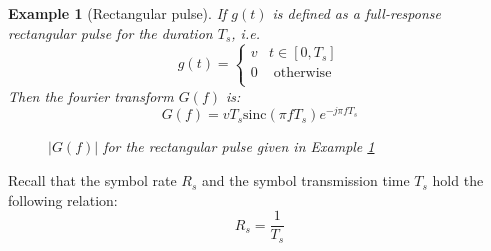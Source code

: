 \documentclass[onecolumn,x11names,technote,twoside,a4paper,12pt,english]{IEEEtran}
\newtheorem{example}{Example}
\begin{document}
\begin{example}[Rectangular pulse]
  \label{ex:rect-pulse}
  If $g(t)$ is defined as a full-response rectangular pulse for the duration $T_s$, i.e.
  \begin{equation}
    \label{eq:fp-rect}
    g(t) = \left\{ \begin{array}{rl} v & t \in [0,T_s] \\
        0 &\mbox{ otherwise} \\
      \end{array} \right.
  \end{equation}
  Then the fourier transform $G(f)$ is:
  \begin{equation}
    \label{eq:fp-rect-fourier}
    G(f) = v T_s \mathrm{sinc}(\pi f T_s) e^{-j \pi f T_s}
  \end{equation}
  \begin{figure}[h!]
    \centering
    \label{fig:fp-rect-fourier}
    \caption{$|G(f)|$ for the rectangular pulse given in Example \ref{ex:rect-pulse}}
  \end{figure}
\end{example}

Recall that the symbol rate $R_s$ and the symbol transmission time $T_s$ hold the following relation:
\begin{equation*}
  R_s = \frac{1}{T_s}
\end{equation*}
\end{document}
